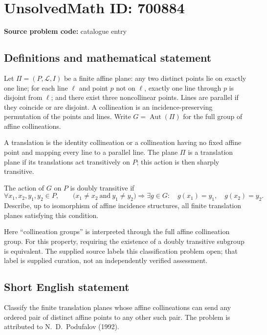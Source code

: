 \documentclass[11pt]{article}
\begin{document}
\section*{UnsolvedMath ID: 700884}
\textbf{Source problem code:} catalogue entry
\subsection{Definitions and mathematical statement}
Let \(\Pi=(P,\mathcal L,I)\) be a finite affine plane: any two distinct points lie on exactly one line; for each line \(\ell\) and point \(p\) not on \(\ell\), exactly one line through \(p\) is disjoint from \(\ell\); and there exist three noncollinear points. Lines are parallel if they coincide or are disjoint. A collineation is an incidence-preserving permutation of the points and lines. Write \(G=\operatorname{Aut}(\Pi)\) for the full group of affine collineations.

A translation is the identity collineation or a collineation having no fixed affine point and mapping every line to a parallel line. The plane \(\Pi\) is a translation plane if its translations act transitively on \(P\); this action is then sharply transitive.

The action of \(G\) on \(P\) is doubly transitive if
\[
\forall x_1,x_2,y_1,y_2\in P,\qquad
\bigl(x_1\ne x_2\ \text{and}\ y_1\ne y_2\bigr)
\Longrightarrow
\exists g\in G:\quad g(x_1)=y_1,\quad g(x_2)=y_2.
\]
Describe, up to isomorphism of affine incidence structures, all finite translation planes satisfying this condition.

Here ``collineation groups'' is interpreted through the full affine collineation group. For this property, requiring the existence of a doubly transitive subgroup is equivalent. The supplied source labels this classification problem open; that label is supplied curation, not an independently verified assessment.
\subsection{Short English statement}
Classify the finite translation planes whose affine collineations can send any ordered pair of distinct affine points to any other such pair. The problem is attributed to N.\ D.\ Podufalov (1992).
\end{document}
